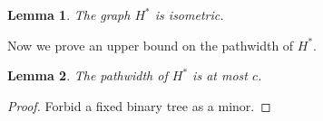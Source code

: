 \documentclass[a4paper]{article}
\newtheorem{lemma}{Lemma}
\begin{document}
\begin{lemma}\label{lem:2nd-isometric}
	The graph $H^*$ is isometric.
\end{lemma}

Now we prove an upper bound on the pathwidth of $H^*$.

\begin{lemma}
	The pathwidth of $H^*$ is at most $c$. 
\end{lemma}
\begin{proof}
	Forbid a fixed binary tree as a minor.
\end{proof}


\end{document}
